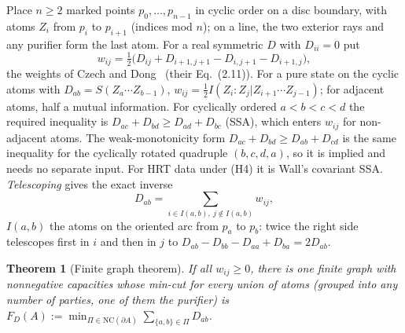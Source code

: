 \documentclass[aps,prd,onecolumn,superscriptaddress,nofootinbib,amsmath,amssymb,11pt]{revtex4-2}
\newtheorem{theorem}{Theorem}[section]
\theoremstyle{definition}
\begin{document}
Place $n\ge2$ marked points $p_0,\dots,p_{n-1}$ in cyclic order on a disc boundary, with atoms $Z_i$ from $p_i$ to $p_{i+1}$ (indices mod
$n$); on a line, the two exterior rays and any purifier form the last atom. For a real symmetric $D$ with $D_{ii}=0$ put
\begin{equation}\label{eq:T8}
w_{ij}=\tfrac12\big(D_{ij}+D_{i+1,j+1}-D_{i,j+1}-D_{i+1,j}\big),
\end{equation}
the weights of Czech and Dong~\cite{CzechDong2019} (their Eq.~(2.11)). For a pure state on the cyclic atoms with $D_{ab}=S(Z_a\cdots Z_{b-1})$,
$w_{ij}=\frac12I(Z_i:Z_j|Z_{i+1}\cdots Z_{j-1})$; for adjacent atoms, half a mutual information. For cyclically ordered $a<b<c<d$ the required inequality is
$D_{ac}+D_{bd}\ge D_{ad}+D_{bc}$ (SSA), which enters $w_{ij}$ for non-adjacent atoms. The weak-monotonicity form
$D_{ac}+D_{bd}\ge D_{ab}+D_{cd}$ is the same inequality for the cyclically rotated quadruple $(b,c,d,a)$, so it is implied and needs no
separate input. For HRT data under (H4) it is Wall's covariant SSA.
\emph{Telescoping} gives the exact inverse
\begin{equation}\label{eq:T9}
D_{ab}=\sum_{i\in I(a,b),\ j\notin I(a,b)}w_{ij},
\end{equation}
$I(a,b)$ the atoms on the oriented arc from $p_a$ to $p_b$: twice the right side telescopes first in $i$ and then in $j$ to
$D_{ab}-D_{bb}-D_{aa}+D_{ba}=2D_{ab}$.

\begin{theorem}[Finite graph theorem]\label{thm:finitegraph}
If all $w_{ij}\ge0$, there is one finite graph with nonnegative capacities whose min-cut for every union of atoms (grouped into any
number of parties, one of them the purifier) is $F_D(A):=\min_{\Pi\in\mathrm{NC}(\partial A)}\sum_{\{a,b\}\in\Pi}D_{ab}$.
\end{theorem}
\end{document}
